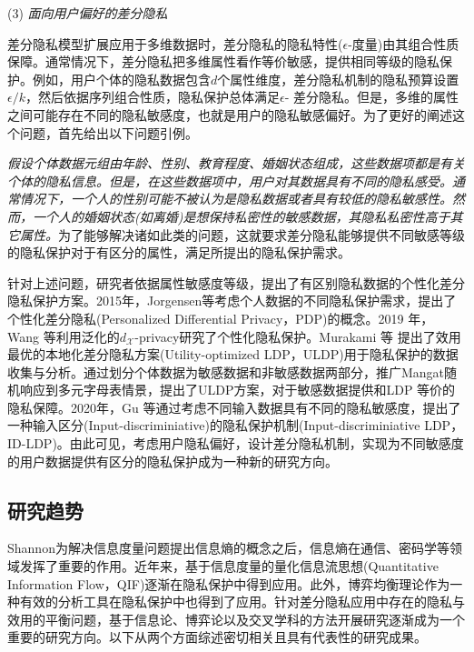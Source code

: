(3) {\em 面向用户偏好的差分隐私}

差分隐私模型扩展应用于多维数据时，差分隐私的隐私特性($\epsilon$-度量)由其组合性质保障。通常情况下，差分隐私把多维属性看作等价敏感，提供相同等级的隐私保护。例如，用户个体的隐私数据包含$d$个属性维度，差分隐私机制的隐私预算设置$\epsilon/k$，然后依据序列组合性质，隐私保护总体满足$\epsilon$- 差分隐私。但是，多维的属性之间可能存在不同的隐私敏感度，也就是用户的隐私敏感偏好。为了更好的阐述这个问题，首先给出以下问题引例。

{\em 假设个体数据元组由年龄、性别、教育程度、婚姻状态组成，这些数据项都是有关个体的隐私信息。但是，在这些数据项中，用户对其数据具有不同的隐私感受。通常情况下，一个人的性别可能不被认为是隐私数据或者具有较低的隐私敏感性。然而，一个人的婚姻状态(如离婚)是想保持私密性的敏感数据，其隐私私密性高于其它属性。}为了能够解决诸如此类的问题，这就要求差分隐私能够提供不同敏感等级的隐私保护对于有区分的属性，满足所提出的隐私保护需求。

针对上述问题，研究者依据属性敏感度等级，提出了有区别隐私数据的个性化差分隐私保护方案\cite{chen2016private}。2015年，Jorgensen等\cite{jorgensen2015conservative}考虑个人数据的不同隐私保护需求，提出了个性化差分隐私(Personalized Differential Privacy，PDP)的概念。2019 年，Wang 等\cite{wang2019personalized}利用泛化的$d_{\mathcal{X}}$-privacy\cite{chatzikokolakis2013broadening}研究了个性化隐私保护。Murakami 等\cite{murakami2019utility} 提出了效用最优的本地化差分隐私方案(Utility-optimized LDP，ULDP)用于隐私保护的数据收集与分析。通过划分个体数据为敏感数据和非敏感数据两部分，推广Mangat\cite{mangat1994an}随机响应到多元字母表情景，提出了ULDP方案，对于敏感数据提供和LDP 等价的隐私保障。2020年，Gu 等\cite{gu2020providing}通过考虑不同输入数据具有不同的隐私敏感度，提出了一种输入区分(Input-discriminiative)的隐私保护机制(Input-discriminiative LDP，ID-LDP)。由此可见，考虑用户隐私偏好，设计差分隐私机制，实现为不同敏感度的用户数据提供有区分的隐私保护成为一种新的研究方向。


\subsection{研究趋势}
Shannon\cite{shannon1948a}为解决信息度量问题提出信息熵的概念之后，信息熵在通信、密码学等领域发挥了重要的作用。近年来，基于信息度量的量化信息流思想(Quantitative Information Flow，QIF)\cite{smith2009on}逐渐在隐私保护中得到应用。此外，博弈均衡理论作为一种有效的分析工具在隐私保护中也得到了应用。针对差分隐私应用中存在的隐私与效用的平衡问题，基于信息论、博弈论以及交叉学科的方法开展研究逐渐成为一个重要的研究方向。以下从两个方面综述密切相关且具有代表性的研究成果。

